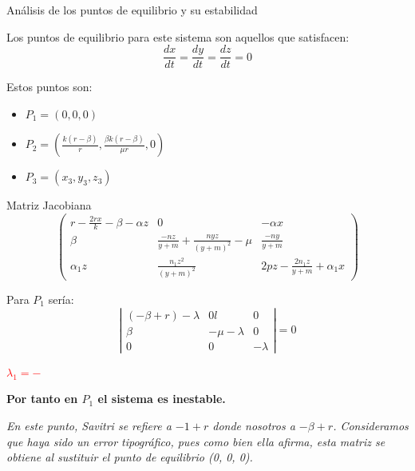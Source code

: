 \documentclass{beamer}
\begin{document}
\begin{frame}{Análisis de los puntos de equilibrio y su estabilidad}

    Los puntos de equilibrio para este sistema son aquellos que satisfacen:
    $$\frac{dx}{dt}=\frac{dy}{dt}=\frac{dz}{dt}=0$$

    Estos puntos son:
    \begin{itemize}
        \item $P_1=(0, 0, 0)$
        \item $P_2=(\frac{k(r-\beta)}{r}, \frac{\beta k(r-\beta)}{\mu r}, 0)$
        \item $P_3=(x_3, y_3, z_3)$
    \end{itemize}
\end{frame}

\begin{frame}
    {Matriz Jacobiana}
    $$\left(
        \begin{array}{ccc}
                r-\frac{2rx}{k}-\beta-\alpha z & 0                                       & -\alpha x                       \\
                \beta                          & \frac{-nz}{y+m}+\frac{nyz}{(y+m)^2}-\mu & \frac{-ny}{y+m}                 \\
                \alpha_1z                      & \frac{n_1z^2}{(y+m)^2}                  & 2pz-\frac{2n_1z}{y+m}+\alpha_1x
            \end{array}
        \right)$$
\end{frame}

\begin{frame}
    Para $P_1$ sería:
    $$\left|
        \begin{array}{ccc}
            (-\beta+r)-\lambda & 0      l     & 0        \\
            \beta              & -\mu-\lambda & 0        \\
            0                  & 0            & -\lambda
        \end{array}
        \right| =0$$

    \textcolor{red}{$\lambda_1=-$}

    {\bf Por tanto en $P_1$ el sistema es inestable.}
    \vspace*{0.7cm}

    {\it\scriptsize En este punto, Savitri se refiere a $-1+r$ donde nosotros a $-\beta+r$. Consideramos que haya sido un error tipográfico, pues como bien ella
        afirma, esta matriz se obtiene al sustituir el punto de equilibrio (0, 0, 0).}

\end{frame}
\end{document}
